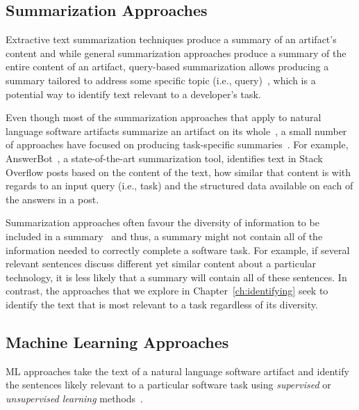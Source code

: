 \subsection{Summarization Approaches}
\label{cp2:summarization}



Extractive text summarization techniques 
produce a summary of an artifact's content
and while general summarization approaches produce a summary of the entire content of an artifact, 
query-based summarization allows 
producing a summary tailored to address some specific topic (i.e., query)~\cite{Goldsteinet1999}, which is a potential way to identify 
text relevant to a developer's task. 


Even though most of the summarization approaches that apply to natural language software artifacts 
summarize an artifact on its whole~\cite{Rastkar2010, Murray2008, Lotufo2012, Ponzanelli2015},
a small number of approaches have focused on
producing task-specific summaries~\cite{Xu2017, silva2019}.
For example, 
 AnswerBot~\cite{Xu2017},
 a state-of-the-art summarization tool, 
identifies text
in Stack Overflow posts 
based on 
the content of the text, how similar that content is with regards to an input query (i.e., task)
and the structured data available on each of the answers in a post.



Summarization approaches often favour the diversity of information to be included in a summary~\cite{Carbonell1998,li2018deep}
and thus, a summary might not contain all of the information needed 
to correctly complete a software task.
For example, if several relevant sentences discuss different yet similar content about 
a particular technology, it is less likely that a summary will contain all of these sentences. 
In contrast, the approaches that we explore in Chapter~\ref{ch:identifying}
seek to identify the text that is most relevant to a task regardless 
of its diversity.





\subsection{Machine Learning Approaches}
\label{cp2:machine-learning}


\acf{ML} approaches take the text of a natural language software artifact and identify 
the sentences likely relevant to a particular software task using \textit{supervised} or 
\textit{unsupervised learning} methods~\cite{zhang2005machine}.



